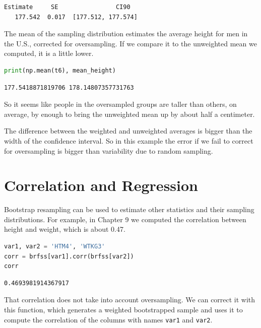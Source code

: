 \begin{lstlisting}[style=output]
  Estimate     SE                CI90
   177.542  0.017  [177.512, 177.574]
\end{lstlisting}

The mean of the sampling distribution estimates the average height for
men in the U.S., corrected for oversampling. If we compare it to the
unweighted mean we computed, it is a little lower.

\begin{lstlisting}[language=Python,style=source]
print(np.mean(t6), mean_height)
\end{lstlisting}

\begin{lstlisting}[style=output]
177.5418871819706 178.14807357731763
\end{lstlisting}

So it seems like people in the oversampled groups are taller than
others, on average, by enough to bring the unweighted mean up by about
half a centimeter.

The difference between the weighted and unweighted averages is bigger
than the width of the confidence interval. So in this example the error
if we fail to correct for oversampling is bigger than variability due to
random sampling.

\hypertarget{correlation-and-regression}{%
\section{Correlation and Regression}\label{correlation-and-regression}}

Bootstrap resampling can be used to estimate other statistics and their
sampling distributions. For example, in Chapter 9 we computed the
correlation between height and weight, which is about 0.47.

\begin{lstlisting}[language=Python,style=source]
var1, var2 = 'HTM4', 'WTKG3'
corr = brfss[var1].corr(brfss[var2])
corr
\end{lstlisting}

\begin{lstlisting}[style=output]
0.4693981914367917
\end{lstlisting}

That correlation does not take into account oversampling. We can correct
it with this function, which generates a weighted bootstrapped sample
and uses it to compute the correlation of the columns with names
\passthrough{\lstinline!var1!} and \passthrough{\lstinline!var2!}.

